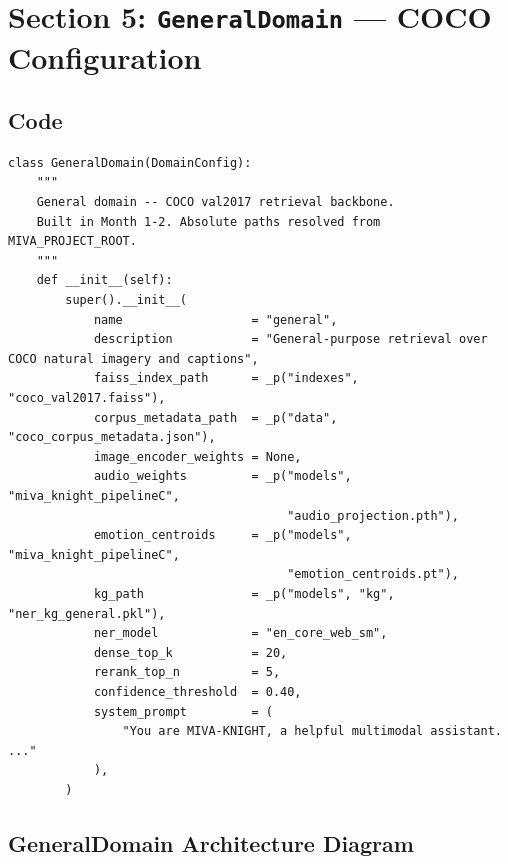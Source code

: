 \documentclass[12pt,a4paper]{article}
\theoremstyle{definition}
\theoremstyle{remark}
\begin{document}
\section{Section 5: \texttt{GeneralDomain} — COCO Configuration}

\subsection{Code}

\begin{lstlisting}[caption={\texttt{GeneralDomain} class}]
class GeneralDomain(DomainConfig):
    """
    General domain -- COCO val2017 retrieval backbone.
    Built in Month 1-2. Absolute paths resolved from MIVA_PROJECT_ROOT.
    """
    def __init__(self):
        super().__init__(
            name                  = "general",
            description           = "General-purpose retrieval over COCO natural imagery and captions",
            faiss_index_path      = _p("indexes", "coco_val2017.faiss"),
            corpus_metadata_path  = _p("data", "coco_corpus_metadata.json"),
            image_encoder_weights = None,
            audio_weights         = _p("models", "miva_knight_pipelineC",
                                       "audio_projection.pth"),
            emotion_centroids     = _p("models", "miva_knight_pipelineC",
                                       "emotion_centroids.pt"),
            kg_path               = _p("models", "kg", "ner_kg_general.pkl"),
            ner_model             = "en_core_web_sm",
            dense_top_k           = 20,
            rerank_top_n          = 5,
            confidence_threshold  = 0.40,
            system_prompt         = (
                "You are MIVA-KNIGHT, a helpful multimodal assistant. ..."
            ),
        )
\end{lstlisting}

\subsection{GeneralDomain Architecture Diagram}
\end{document}
